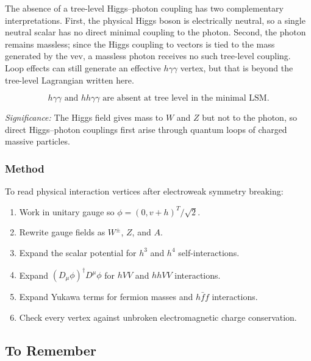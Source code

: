 The absence of a tree-level Higgs--photon coupling has two complementary
interpretations. First, the physical Higgs boson is electrically neutral, so a
single neutral scalar has no direct minimal coupling to the photon. Second, the
photon remains massless; since the Higgs coupling to vectors is tied to the
mass generated by the vev, a massless photon receives no such tree-level
coupling. Loop effects can still generate an effective $h\gamma\gamma$ vertex,
but that is beyond the tree-level Lagrangian written here.

\begin{equation}
  \boxed{\;h\gamma\gamma\text{ and }hh\gamma\gamma\text{ are absent at tree level in the minimal LSM}.\;}
  \label{eq:lec18:no-tree-higgs-photon}
\end{equation}

\textit{Significance:} The Higgs field gives mass to $W$ and $Z$ but not to the photon, so direct Higgs--photon couplings first arise through quantum loops of charged massive particles.

\subsubsection*{Method}

To read physical interaction vertices after electroweak symmetry breaking:
\begin{enumerate}
  \item Work in unitary gauge so $\phi=(0,v+h)^T/\sqrt2$.
  \item Rewrite gauge fields as $W^\pm$, $Z$, and $A$.
  \item Expand the scalar potential for $h^3$ and $h^4$ self-interactions.
  \item Expand $(D_\mu\phi)^\dagger D^\mu\phi$ for $hVV$ and $hhVV$ interactions.
  \item Expand Yukawa terms for fermion masses and $h\bar f f$ interactions.
  \item Check every vertex against unbroken electromagnetic charge conservation.
\end{enumerate}


\subsection*{To Remember}

